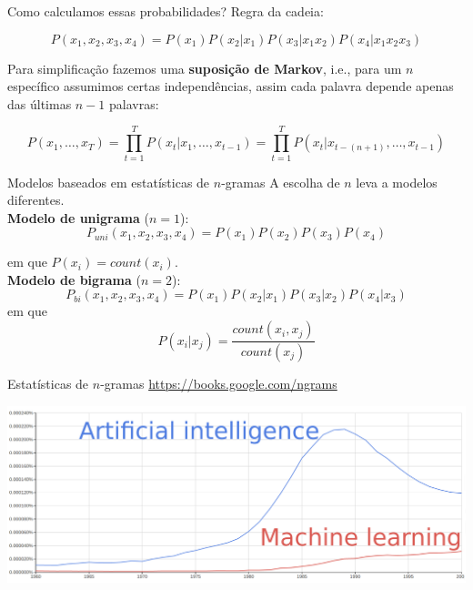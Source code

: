 \documentclass[10pt]{beamer}
\begin{document}
\begin{frame}{Como calculamos essas probabilidades?}
Regra da cadeia:

\begin{equation*}
P(x_1,x_2,x_3,x_4) = P(x_1)P(x_2\vert x_1)P(x_3\vert x_1x_2)P(x_4\vert x_1x_2x_3)
\end{equation*}

\vspace{0.3cm}

Para simplificação fazemos uma \textbf{suposição de Markov}, i.e., para um  $n$ específico assumimos certas independências, assim cada palavra depende apenas das últimas $n-1$ palavras:



\begin{equation*}
P(x_1, \dots, x_T) = \prod_{t=1}^{T} P(x_t \vert x_1, \dots, x_{t-1}) = \prod_{t=1}^{T} P(x_{t} \vert x_{t - (n+1)}, \dots, x_{t-1})
\end{equation*} 

\end{frame}

\begin{frame}{Modelos baseados em estatísticas de $n$-gramas}
A escolha de $n$ leva a modelos diferentes.\\

\textbf{Modelo de unigrama} ($n=1$): 
\begin{equation*}
P_{uni}(x_1, x_2, x_3, x_4) = P(x_1)P(x_2)P(x_3)P(x_4)
\end{equation*}

em que $P(x_i) = count(x_i)$.\\

\textbf{Modelo de bigrama} ($n=2$): 
\begin{equation*}
P_{bi}(x_1,x_2,x_3,x_4) = P(x_1)P(x_2\vert x_1)P(x_3\vert x_2)P(x_4\vert x_3)
\end{equation*} 
em que
\[
P(x_i\vert x_j) = \frac{count(x_i, x_j)}{count(x_j)}
\]
\end{frame}

\begin{frame}{Estatísticas de $n$-gramas}
\url{https://books.google.com/ngrams}
\vspace{0.4cm}

\includegraphics[scale=0.14]{images/AI_ML.png}
\end{frame}
\end{document}
